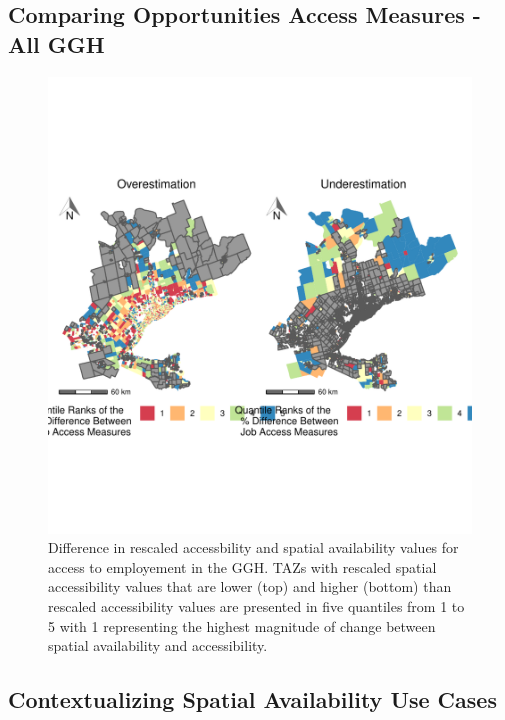 \documentclass[]{elsarticle} %
\begin{document}
\hypertarget{comparing-opportunities-access-measures---all-ggh}{%
\subsection{Comparing Opportunities Access Measures - All
GGH}\label{comparing-opportunities-access-measures---all-ggh}}

\begin{figure}
\includegraphics[width=1\linewidth]{Spatial-Availability_files/figure-latex/indexed-measures-comparison-plot-GGH-1} \caption{\label{fig:indexed-measures-comparison-plot-GGH}Difference in rescaled accessbility and spatial availability values for access to employement in the GGH. TAZs with rescaled spatial accessibility values that are lower (top) and higher (bottom) than rescaled accessibility values are presented in five quantiles from 1 to 5 with 1 representing the highest magnitude of change between spatial availability and accessibility.}\label{fig:indexed-measures-comparison-plot-GGH}
\end{figure}

\hypertarget{contextualizing-spatial-availability-use-cases}{%
\subsection{Contextualizing Spatial Availability Use
Cases}\label{contextualizing-spatial-availability-use-cases}}
\end{document}
